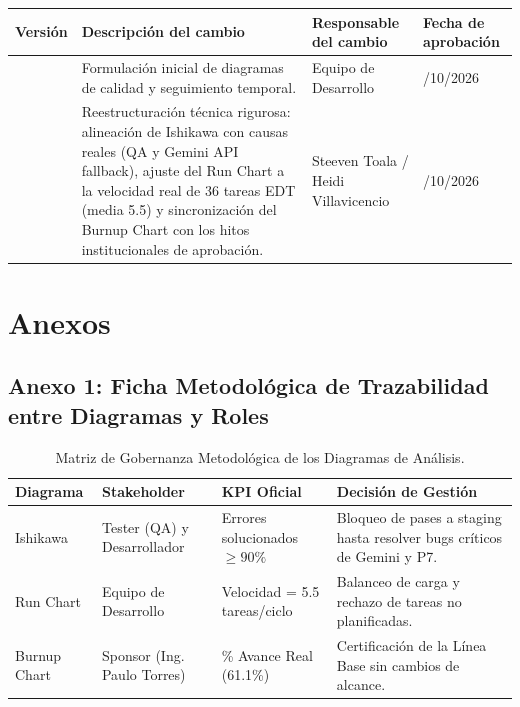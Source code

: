 \documentclass[12pt,a4paper]{article}
\begin{document}
\noindent
\renewcommand{\arraystretch}{1.2}
\begin{tabularx}{\textwidth}{|>{\hsize=0.45\hsize\centering\arraybackslash}X|>{\hsize=1.55\hsize\raggedright\arraybackslash}X|>{\hsize=1.2\hsize\raggedright\arraybackslash}X|>{\hsize=0.8\hsize\centering\arraybackslash}X|}
    \hline
    \rowcolor{tableheader}
    \textbf{Versión} & \textbf{Descripción del cambio} & \textbf{Responsable del cambio} & \textbf{Fecha de aprobación} \\
    \hline
    1.0 & Formulación inicial de diagramas de calidad y seguimiento temporal. & Equipo de Desarrollo & 12/10/2026 \\
    \hline
    2.0 & Reestructuración técnica rigurosa: alineación de Ishikawa con causas reales (QA y Gemini API fallback), ajuste del Run Chart a la velocidad real de 36 tareas EDT (media 5.5) y sincronización del Burnup Chart con los hitos institucionales de aprobación. & Steeven Toala / Heidi Villavicencio & 12/10/2026 \\
    \hline
\end{tabularx}

\vspace{0.4cm}

\section{Anexos}

\subsection*{Anexo 1: Ficha Metodológica de Trazabilidad entre Diagramas y Roles}
\begin{table}[H]
\centering
\small
\begin{tabularx}{\textwidth}{|l|l|l|X|}
\hline
\rowcolor{tableheader}
\textbf{Diagrama} & \textbf{Stakeholder} & \textbf{KPI Oficial} & \textbf{Decisión de Gestión} \\ \hline
Ishikawa & Tester (QA) y Desarrollador & Errores solucionados $\ge 90\%$ & Bloqueo de pases a staging hasta resolver bugs críticos de Gemini y P7. \\ \hline
Run Chart & Equipo de Desarrollo & Velocidad = 5.5 tareas/ciclo & Balanceo de carga y rechazo de tareas no planificadas. \\ \hline
Burnup Chart & Sponsor (Ing. Paulo Torres) & \% Avance Real (61.1\%) & Certificación de la Línea Base sin cambios de alcance. \\ \hline
\end{tabularx}
\caption{Matriz de Gobernanza Metodológica de los Diagramas de Análisis.}
\label{tab:anexo_gobernanza}
\end{table}
\end{document}

